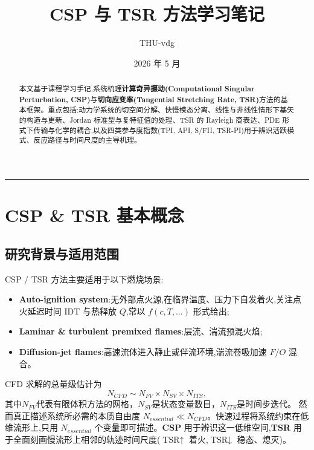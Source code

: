 \documentclass[11pt,a4paper]{article}
\title{\bfseries CSP 与 TSR 方法学习笔记}
\author{THU-vdg}
\date{2026 年 5 月}
\begin{document}
\maketitle

\begin{abstract}
本文基于课程学习手记,系统梳理\textbf{计算奇异摄动(Computational Singular Perturbation, CSP)}与\textbf{切向应变率(Tangential Stretching Rate, TSR)}方法的基本框架。重点包括:动力学系统的切空间分解、快慢模态分离、线性与非线性情形下基矢的构造与更新、Jordan 标准型与复特征值的处理、TSR 的 Rayleigh 商表达、PDE 形式下传输与化学的耦合,以及四类参与度指数(TPI, API, S/FII, TSR-PI)用于辨识活跃模式、反应路径与时间尺度的主导机理。
\end{abstract}

\tableofcontents
\vspace{0.5em}\hrule\vspace{1em}

\section{CSP \& TSR 基本概念}

\subsection{研究背景与适用范围}

CSP / TSR 方法主要适用于以下燃烧场景:
\begin{itemize}[leftmargin=2em]
    \item \textbf{Auto-ignition system}:无外部点火源,在临界温度、压力下自发着火,关注点火延迟时间 IDT 与热释放 $Q$,常以 $f(c,T,\dots)$ 形式给出;
    \item \textbf{Laminar \& turbulent premixed flames}:层流、湍流预混火焰;
    \item \textbf{Diffusion-jet flames}:高速流体进入静止或伴流环境,湍流卷吸加速 $F/O$ 混合。
\end{itemize}

CFD 求解的总量级估计为
\begin{equation}
N_{CFD}\sim N_{FV}\times N_{SV}\times N_{ITS},
\end{equation}
其中$N_{FV}$代表有限体积方法的网格，$N_{SV}$是状态变量数目，$N_{ITS}$是时间步迭代。
然而真正描述系统所必需的本质自由度 $N_{essential}\ll N_{CFD}$。快速过程将系统约束在低维流形上,只用 $N_{essential}$ 个变量即可描述。\textbf{CSP} 用于辨识这一低维空间,\textbf{TSR} 用于全面刻画慢流形上相邻的轨迹时间尺度($\text{TSR}\uparrow$ 着火,$\text{TSR}\downarrow$ 稳态、熄灭)。
\end{document}
